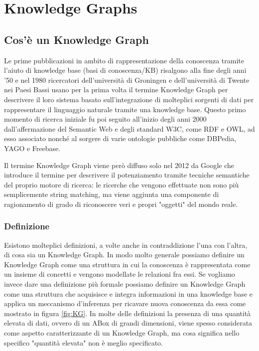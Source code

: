 \chapter{Knowledge Graphs}
\label{cha:vkg}

\section{Cos'è un Knowledge Graph}
\label{sec:kg_description}

Le prime pubblicazioni in ambito di rappresentazione della conoscenza tramite l'aiuto di knowledge base (basi di conoscenza/KB) risalgono alla fine degli anni '50 e nel 1980 ricercatori dell'università di Groningen 
e dell'università di Twente nei Paesi Bassi usano per la prima volta il termine Knowledge Graph per descrivere il loro sistema basato sull'integrazione di molteplici sorgenti
di dati per rappresentare il linguaggio naturale tramite una knowledge base.
Questo primo momento di ricerca iniziale fu poi seguito all'inizio degli anni 2000 dall'affermazione del Semantic Web e degli standard W3C, come RDF e OWL, ad esso associato 
nonché al sorgere di varie ontologie pubbliche come DBPedia, YAGO e Freebase. \cite{KGDefinition} \cite{KGSurvey}

Il termine Knowledge Graph viene però diffuso solo nel 2012 da Google che introduce il termine per descrivere il potenziamento tramite tecniche semantiche del proprio motore di ricerca: 
le ricerche che vengono effettuate non sono più semplicemente string matching, ma viene aggiunta una componente di ragionamento di grado di riconoscere veri e propri "oggetti" del 
mondo reale. \cite{KGDefinition}

\subsection{Definizione}
Esistono molteplici definizioni, a volte anche in contraddizione l'una con l'altra, di cosa sia un Knowledge Graph.
In modo molto generale possiamo definire un Knowledge Graph come una struttura in cui la conoscenza è rappresentata come un insieme di concetti e vengono modellate le relazioni fra essi.
Se vogliamo invece dare una definizione più formale possiamo definire un Knowledge Graph come una struttura che acquisisce e integra informazioni in una knowledge base
e applica un meccanismo d'inferenza per ricavare nuova conoscenza da essa come mostrato in figura \ref{fig:KG}.
In molte delle definizioni la presenza di una quantità elevata di dati, ovvero di un ABox di grandi dimensioni, viene spesso considerata come aspetto caratterizzante di un Knowledge Graph,
ma cosa significa nello specifico "quantità elevata" non è meglio specificato. \cite{KGDefinition}

